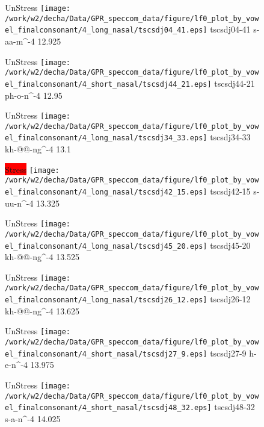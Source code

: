 \documentclass{article}
\begin{document}
\begin{figure}[t]
\begin{minipage}[b]{.24\textwidth}
UnStress
\centering
\texttt{[image: /work/w2/decha/Data/GPR\_speccom\_data/figure/lf0\_plot\_by\_vowel\_finalconsonant/4\_long\_nasal/tscsdj04\_41.eps]}
tscsdj04-41 s-aa-m\textasciicircum-4 12.925
\end{minipage}
\begin{minipage}[b]{.24\textwidth}
UnStress
\centering
\texttt{[image: /work/w2/decha/Data/GPR\_speccom\_data/figure/lf0\_plot\_by\_vowel\_finalconsonant/4\_short\_nasal/tscsdj44\_21.eps]}
tscsdj44-21 ph-o-n\textasciicircum-4 12.95
\end{minipage}
\begin{minipage}[b]{.24\textwidth}
UnStress
\centering
\texttt{[image: /work/w2/decha/Data/GPR\_speccom\_data/figure/lf0\_plot\_by\_vowel\_finalconsonant/4\_long\_nasal/tscsdj34\_33.eps]}
tscsdj34-33 kh-@@-ng\textasciicircum-4 13.1
\end{minipage}
\begin{minipage}[b]{.24\textwidth}
\colorbox{red}{Stress}
\centering
\texttt{[image: /work/w2/decha/Data/GPR\_speccom\_data/figure/lf0\_plot\_by\_vowel\_finalconsonant/4\_long\_nasal/tscsdj42\_15.eps]}
tscsdj42-15 s-uu-n\textasciicircum-4 13.325
\end{minipage}
\end{figure}

\begin{figure}[t]
\begin{minipage}[b]{.24\textwidth}
UnStress
\centering
\texttt{[image: /work/w2/decha/Data/GPR\_speccom\_data/figure/lf0\_plot\_by\_vowel\_finalconsonant/4\_long\_nasal/tscsdj45\_20.eps]}
tscsdj45-20 kh-@@-ng\textasciicircum-4 13.525
\end{minipage}
\begin{minipage}[b]{.24\textwidth}
UnStress
\centering
\texttt{[image: /work/w2/decha/Data/GPR\_speccom\_data/figure/lf0\_plot\_by\_vowel\_finalconsonant/4\_long\_nasal/tscsdj26\_12.eps]}
tscsdj26-12 kh-@@-ng\textasciicircum-4 13.625
\end{minipage}
\begin{minipage}[b]{.24\textwidth}
UnStress
\centering
\texttt{[image: /work/w2/decha/Data/GPR\_speccom\_data/figure/lf0\_plot\_by\_vowel\_finalconsonant/4\_short\_nasal/tscsdj27\_9.eps]}
tscsdj27-9 h-e-n\textasciicircum-4 13.975
\end{minipage}
\begin{minipage}[b]{.24\textwidth}
UnStress
\centering
\texttt{[image: /work/w2/decha/Data/GPR\_speccom\_data/figure/lf0\_plot\_by\_vowel\_finalconsonant/4\_short\_nasal/tscsdj48\_32.eps]}
tscsdj48-32 s-a-n\textasciicircum-4 14.025
\end{minipage}
\end{figure}
\end{document}
